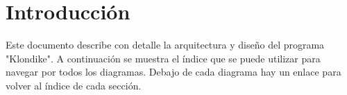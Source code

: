 \newpage{}
\section{Introducción}
Este documento describe con detalle la arquitectura y diseño del programa "Klondike".
A continuación se muestra el índice que se puede utilizar para navegar por todos los diagramas. Debajo de cada diagrama hay un enlace
para volver al índice de cada sección.


\setcounter{tocdepth}{1}
\setcounter{secttocdepth}{5}
\tableofcontents